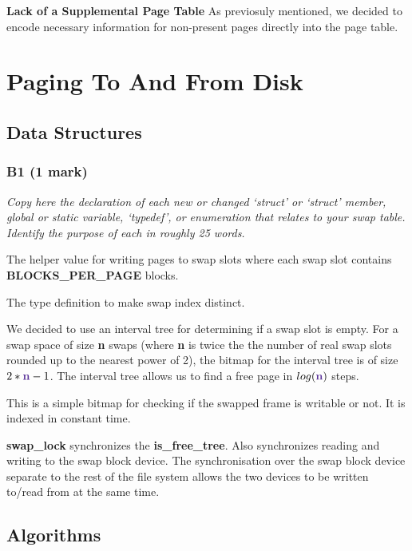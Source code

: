 \documentclass{report}
\newcommand{\question}[1]{\textit{#1} \ }
\newcommand{\file}[1]{\textcolor{YellowGreen}{\textbf{#1}}}
\newcommand{\var}[1]{\textcolor{RoyalPurple}{\textbf{#1}}}
\newcommand{\const}[1]{\textcolor{BrickRed}{\textbf{#1}}}
\newcommand{\pintoscode}[4]{}
\newcommand{\pintosfile}[3]{\pintoscode{#1}{#2}{\file{#3}}{#3}}
\begin{document}
				\textbf{Lack of a Supplemental Page Table}
				As previosuly mentioned, we decided to encode necessary 
				information for non-present pages directly into the page table.
				
	\section*{Paging To And From Disk}
		\subsection*{Data Structures}
			\subsubsection*{B1 (1 mark)}
				\question{Copy here the declaration of each new or changed `struct' or
				`struct' member, global or static variable, `typedef', or enumeration 
				that relates to your swap table. Identify the purpose of each in roughly
				25 words.}
				
				\pintosfile{10}{10}{swap.c}
				The helper value for writing pages to swap slots where each swap 
				slot contains \const{BLOCKS\_PER\_PAGE} blocks.

				\pintosfile{9}{9}{swap.h}
				The type definition to make swap index distinct.
				
				\pintosfile{12}{12}{swap.c}
					We decided to use an interval tree for determining if a 
					swap slot is empty. For a swap space of size \var{n} swaps 
					(where \var{n} is twice the the number of real swap slots
					rounded up to the nearest power of 2), the bitmap for the 
					interval tree is of size $2*\var{n}-1$. The interval tree 
					allows us to find a free page in $log(\var{n})$ steps.
				
				\pintosfile{13}{13}{swap.c}
					This is a simple bitmap for checking if the swapped frame 
					is writable or not. It is indexed in constant time.

				\pintosfile{15}{15}{swap.c}
					
					\var{swap\_lock} synchronizes the \var{is\_free\_tree}. 
					Also synchronizes reading and writing to the swap block 
					device. The synchronisation over the swap block device 
					separate to the rest of the file system allows the two 
					devices to be written to/read from at the same time.

		\subsection*{Algorithms}
\end{document}
